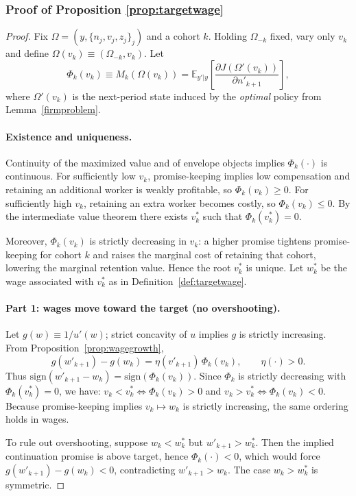 \subsubsection*{Proof of Proposition \ref{prop:targetwage}}\label{proof:targetwage}
\begin{proof}
Fix $\Omega=(y,\{n_j,v_j,z_j\}_j)$ and a cohort $k$. Holding $\Omega_{-k}$ fixed, vary only $v_k$ and define
$\Omega(v_k)\equiv(\Omega_{-k},v_k)$.
Let
\[
\Phi_k(v_k)\equiv M_k(\Omega(v_k))
=
\mathbb E_{y'|y}\left[\frac{\partial J(\Omega'(v_k))}{\partial n'_{k+1}}\right],
\]
where $\Omega'(v_k)$ is the next-period state induced by the \emph{optimal} policy from Lemma~\ref{firmproblem}.

\medskip
\noindent\paragraph{Existence and uniqueness.}
Continuity of the maximized value and of envelope objects implies $\Phi_k(\cdot)$ is continuous.
For sufficiently low $v_k$, promise-keeping implies low compensation and retaining an additional worker is weakly profitable,
so $\Phi_k(v_k)\ge 0$. For sufficiently high $v_k$, retaining an extra worker becomes costly, so $\Phi_k(v_k)\le 0$.
By the intermediate value theorem there exists $v_k^*$ such that $\Phi_k(v_k^*)=0$.

Moreover, $\Phi_k(v_k)$ is strictly decreasing in $v_k$: a higher promise tightens promise-keeping for cohort $k$ and raises the
marginal cost of retaining that cohort, lowering the marginal retention value.
Hence the root $v_k^*$ is unique. Let $w_k^*$ be the wage associated with $v_k^*$ as in Definition~\ref{def:targetwage}.

\medskip
\noindent\paragraph{Part 1: wages move toward the target (no overshooting).}
Let $g(w)\equiv 1/u'(w)$; strict concavity of $u$ implies $g$ is strictly increasing.
From Proposition~\ref{prop:wagegrowth},
\[
g(w'_{k+1})-g(w_k)=\eta(v'_{k+1})\,\Phi_k(v_k),
\qquad \eta(\cdot)>0.
\]
Thus $\mathrm{sign}(w'_{k+1}-w_k)=\mathrm{sign}(\Phi_k(v_k))$.
Since $\Phi_k$ is strictly decreasing with $\Phi_k(v_k^*)=0$, we have:
$v_k<v_k^*\Leftrightarrow \Phi_k(v_k)>0$ and $v_k>v_k^*\Leftrightarrow \Phi_k(v_k)<0$.
Because promise-keeping implies $v_k\mapsto w_k$ is strictly increasing, the same ordering holds in wages.

To rule out overshooting, suppose $w_k<w_k^*$ but $w'_{k+1}>w_k^*$.
Then the implied continuation promise is above target, hence $\Phi_k(\cdot)<0$, which would force
$g(w'_{k+1})-g(w_k)<0$, contradicting $w'_{k+1}>w_k$.
The case $w_k>w_k^*$ is symmetric.


\end{proof}
